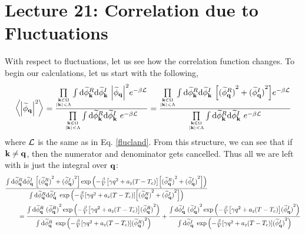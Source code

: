 \section*{Lecture 21: Correlation due to Fluctuations}


With respect to fluctuations, let us see how the correlation function changes. To begin our calculations, let us start with the following, 
\begin{align*}
    \avg{\abs{\widetilde{\phi}_{\vb{q}}}^2} = \frac{\prod\limits_{\tiny \substack{\vb{k}\in \Omega\\ \abs{\vb{k}}<\Lambda}}\int \dd\widetilde{\phi}_{\vb{k}}^R\dd\widetilde{\phi}^I_{\vb{k}}\ \abs{\widetilde{\phi}_{\vb{q}}}^2 e^{-\beta \SL}}{\prod\limits_{\tiny \substack{\vb{k}\in \Omega\\ \abs{\vb{k}}<\Lambda}}\int \dd\widetilde{\phi}_{\vb{k}}^R\dd\widetilde{\phi}^I_{\vb{k}} \ e^{-\beta \SL}}=\frac{\prod\limits_{\tiny \substack{\vb{k}\in \Omega\\ \abs{\vb{k}}<\Lambda}}\int \dd\widetilde{\phi}_{\vb{k}}^R\dd\widetilde{\phi}^I_{\vb{k}}\ \qty[{(\widetilde{\phi}_{\vb{q}}^R)}^2+{(\widetilde{\phi}_{\vb{q}}^I)}^2] e^{-\beta \SL}}{\prod\limits_{\tiny \substack{\vb{k}\in \Omega\\ \abs{\vb{k}}<\Lambda}}\int \dd\widetilde{\phi}_{\vb{k}}^R\dd\widetilde{\phi}^I_{\vb{k}} \ e^{-\beta \SL}}
\end{align*}
where $\mathcal L$ is the same as in Eq. \eqref{flucland}. From this structure, we can see that if $\vb{k} \neq \vb{q}$, then the numerator and denominator gets cancelled. Thus all we are left with is just the integral over $\vb{q}$:
\begin{align*}
    &\frac{\int \dd\widetilde{\phi}_{\vb{q}}^R\dd\widetilde{\phi}^I_{\vb{q}}\ \qty[{(\widetilde{\phi}_{\vb{q}}^R)}^2+{(\widetilde{\phi}_{\vb{q}}^I)}^2] \exp\qty(-\frac{\beta}{V}\qty[\gamma q^2+a\tund{2}(T-T_c)]\qty[{(\widetilde{\phi}_{\vb{q}}^R)}^2+{(\widetilde{\phi}_{\vb{q}}^I)}^2])}{\int \dd\widetilde{\phi}_{\vb{q}}^R\dd\widetilde{\phi}^I_{\vb{q}} \ \exp\qty(-\frac{\beta}{V}\qty[\gamma q^2+a\tund{2}(T-T_c)]\qty[{(\widetilde{\phi}_{\vb{q}}^R)}^2+{(\widetilde{\phi}_{\vb{q}}^I)}^2])} \\ &\quad\quad=  \frac{\int \dd\widetilde{\phi}_{\vb{q}}^R\ {(\widetilde{\phi}_{\vb{q}}^R)}^2 \exp\qty(-\frac{\beta}{V}\qty[\gamma q^2+a\tund{2}(T-T_c)]{(\widetilde{\phi}_{\vb{q}}^R)}^2)}{\int \dd\widetilde{\phi}_{\vb{q}}^R \ \exp\qty(-\frac{\beta}{V}\qty[\gamma q^2+a\tund{2}(T-T_c)]{(\widetilde{\phi}_{\vb{q}}^R)}^2)}+\frac{\int \dd\widetilde{\phi}_{\vb{q}}^I\ {(\widetilde{\phi}_{\vb{q}}^I)}^2 \exp\qty(-\frac{\beta}{V}\qty[\gamma q^2+a\tund{2}(T-T_c)]{(\widetilde{\phi}_{\vb{q}}^I)}^2)}{\int \dd\widetilde{\phi}_{\vb{q}}^I \ \exp\qty(-\frac{\beta}{V}\qty[\gamma q^2+a\tund{2}(T-T_c)]{(\widetilde{\phi}_{\vb{q}}^I)}^2)}
\end{align*}
